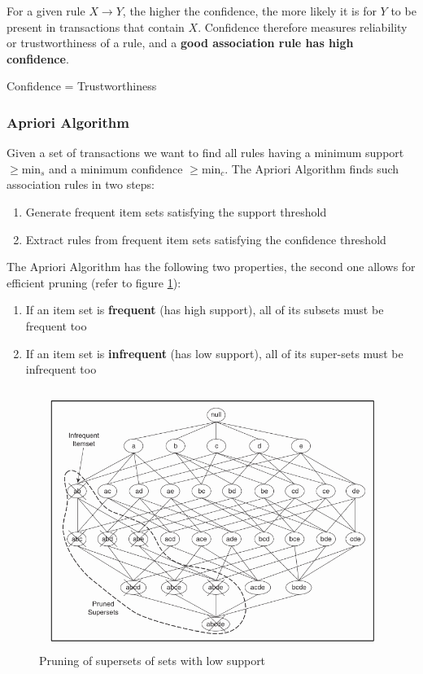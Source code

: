 \documentclass[a4paper, 11pt]{article}
\begin{document}
For a given rule $X \rightarrow Y$, the higher the confidence, the more likely it is for $Y$ to be present in transactions that contain $X$. Confidence therefore measures reliability or trustworthiness of a rule, and a \textbf{good association rule has high confidence}.

\begin{theorem}
	Confidence = Trustworthiness
\end{theorem}

\subsubsection{Apriori Algorithm}

Given a set of transactions we want to find all rules having a minimum support $\geq \text{min}_s$ and a minimum confidence $\geq \text{min}_c$. The Apriori Algorithm finds such association rules in two steps:
\begin{enumerate}
	\item Generate frequent item sets satisfying the support threshold
	\item Extract rules from frequent item sets satisfying the confidence threshold
\end{enumerate}

The Apriori Algorithm has the following two properties, the second one allows for efficient pruning (refer to figure \ref{fig:supersetpruning}):

\begin{enumerate}
	\item If an item set is \textbf{frequent} (has high support), all of its subsets must be frequent too
	\item If an item set is \textbf{infrequent} (has low support), all of its super-sets must be infrequent too
\end{enumerate}

\begin{figure}[tbh!]
	\centering
	\includegraphics[width=0.5\linewidth, keepaspectratio]{Pictures/superset_pruning}
	\caption{Pruning of supersets of sets with low support}
	\label{fig:supersetpruning}
\end{figure}
\end{document}
